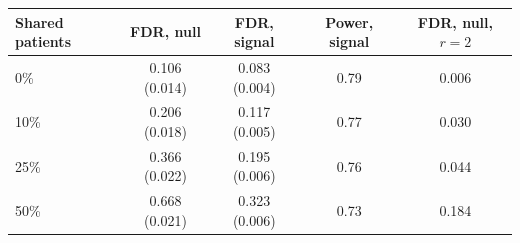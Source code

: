 \begin{tabular}{lcccc}
\toprule
Shared patients & FDR, null & FDR, signal & Power, signal & FDR, null, $r{=}2$ \\
\midrule
0\% & 0.106 (0.014) & 0.083 (0.004) & 0.79 & 0.006 \\
10\% & 0.206 (0.018) & 0.117 (0.005) & 0.77 & 0.030 \\
25\% & 0.366 (0.022) & 0.195 (0.006) & 0.76 & 0.044 \\
50\% & 0.668 (0.021) & 0.323 (0.006) & 0.73 & 0.184 \\
\bottomrule
\end{tabular}
